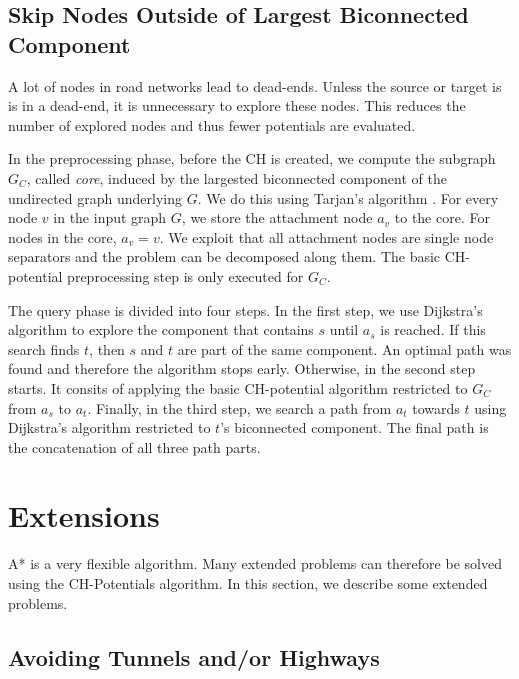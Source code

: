 \documentclass[letterpaper]{article} %
\begin{document}
\subsection{Skip Nodes Outside of Largest Biconnected Component}

\label{sec:largested-biconnected-component}

A lot of nodes in road networks lead to dead-ends.
Unless the source or target is is in a dead-end, it is unnecessary to explore these nodes.
This reduces the number of explored nodes and thus fewer potentials are evaluated.

In the preprocessing phase, before the CH is created, we compute the subgraph $G_C$, called \emph{core}, induced by the largested biconnected component of the undirected graph underlying $G$.
We do this using Tarjan's algorithm \cite{t-dfslg2-72}.
For every node $v$ in the input graph $G$, we store the attachment node $a_v$ to the core.
For nodes in the core, $a_v=v$.
We exploit that all attachment nodes are single node separators and the problem can be decomposed along them.
The basic CH-potential preprocessing step is only executed for $G_C$.

The query phase is divided into four steps.
In the first step, we use Dijkstra's algorithm to explore the component that contains $s$ until $a_s$ is reached.
If this search finds $t$, then $s$ and $t$ are part of the same component.
An optimal path was found and therefore the algorithm stops early.
Otherwise, in the second step starts.
It consits of applying the basic CH-potential algorithm restricted to $G_C$ from $a_s$ to $a_t$.
Finally, in the third step, we search a path from $a_t$ towards $t$ using Dijkstra's algorithm restricted to $t$'s biconnected component.
The final path is the concatenation of all three path parts.

\section{Extensions}
\label{sec:extensions}

A* is a very flexible algorithm. 
Many extended problems can therefore be solved using the CH-Potentials algorithm.
In this section, we describe some extended problems.

\subsection{Avoiding Tunnels and/or Highways}
\label{sec:no-tunnel-highway}
\end{document}
